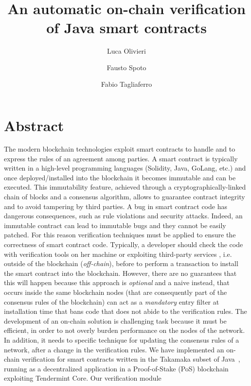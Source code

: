 \documentclass{easychair}
\title{An automatic on-chain verification of Java smart contracts}
\author{
Luca Olivieri\inst{1,2}
\and
Fausto Spoto\inst{1}
\and
Fabio Tagliaferro\inst{1}
}
\institute{
  Università degli Studi di Verona, Italy\\
  \email{\{luca.olivieri, fausto.spoto, fabio.tagliaferro\}@univr.it}
\and
   Corvallis S.r.l., Padova, Italy\\
 }
\begin{document}
\maketitle

\section{Abstract}

  The modern blockchain technologies exploit smart contracts to handle and to express the rules of an agreement among parties.
  A smart contract is typically written in a high-level programming languages (Solidity, Java, GoLang, etc.) and once deployed/installed into the blockchain 
  it becomes immutable and can be executed. This immutability feature, achieved through a cryptogra\-phically-linked chain of blocks and a consensus algorithm, 
  allows to guarantee contract integrity and to avoid tampering by third parties. A bug in smart contract code has dangerous consequences, such as rule violations 
  and security attacks. Indeed, an immutable contract can lead to immutable bugs and they cannot be easily patched.
  For this reason verification techniques must be applied to ensure the correctness of smart contract code. Typically, a developer should check the code with 
  verification tools on her machine or exploiting third-party services \cite{TIGR21, GriecoSCFG20, FeistGG19}, i.e. outside of the blockchain (\emph{off-chain}), before to perform a transaction to 
  install the smart contract into the blockchain. However, there are no guarantees that this will happen because this approach is \emph{optional} and a naive 
  instead, that occurs inside the same blockchain nodes (that are consequently part of the consensus rules of the blockchain) can act as a \emph{mandatory} entry filter at installation time
  that bans code that does not abide to the verification rules. The development of an on-chain solution is 
  challenging task because it must be efficient, in order to not overly burden performance on the nodes of the network. In addition, it needs to specific technique 
  for updating the consensus rules of a network, after a change in the verification rules. We have implemented an on-chain verification for smart contracts written 
  in the Takamaka subset of Java~\cite{Spoto19}, running as a decentralized application in a Proof-of-Stake (PoS) blockchain exploiting Tendermint Core. Our verification module
\end{document}
